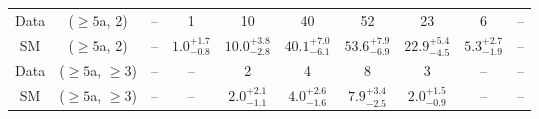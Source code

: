 \begin{table}[h!]
{\begin{tabular}{cccccccccc}
	Data & ($\ge5$a, 2) & -- & 1 & 10 & 40 & 52 & 23 & 6 & -- \\[0.5ex] 
	SM & ($\ge5$a, 2) & -- & $1.0^{+ 1.7 }_{- 0.8 }$ & $10.0^{+ 3.8 }_{- 2.8 }$ & $40.1^{+ 7.0 }_{- 6.1 }$ & $53.6^{+ 7.9 }_{- 6.9 }$ & $22.9^{+ 5.4 }_{- 4.5 }$ & $5.3^{+ 2.7 }_{- 1.9 }$ & -- \\[0.5ex] 
	Data & ($\ge5$a, $\ge3$) & -- & -- & 2 & 4 & 8 & 3 & -- & -- \\[0.5ex] 
	SM & ($\ge5$a, $\ge3$) & -- & -- & $2.0^{+ 2.1 }_{- 1.1 }$ & $4.0^{+ 2.6 }_{- 1.6 }$ & $7.9^{+ 3.4 }_{- 2.5 }$ & $2.0^{+ 1.5 }_{- 0.9 }$ & -- & -- \\[0.5ex] 
	\hline
	\hline
\end{tabular}}
\end{table}
